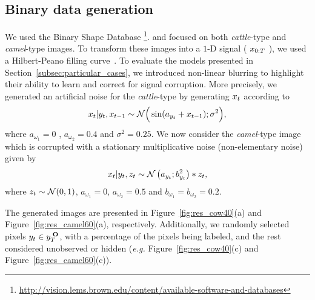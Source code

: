 \subsection{Binary data generation}
\label{subsec:data_generation}
We used the Binary Shape Database
\footnote{\url{http://vision.lems.brown.edu/content/available-software-and-databases}}.
and focused 
on both \textit{cattle}-type and \textit{camel}-type images. 
To transform these images into a $1$-D signal ( $x_{0:T}$ ), 
we used a Hilbert-Peano filling curve~\citep{sagan2012space}. 
To evaluate the models presented in Section~\ref{subsec:particular_cases},
we introduced non-linear blurring to highlight their ability to learn and
correct for signal corruption. 
More precisely, we generated an artificial noise for the \textit{cattle}-type by
generating $x_t$ according to
\begin{equation}
    \label{eq:noise_eq1}
    x_t| y_{t},x_{t-1} \sim \mathcal{N}\Big(\sin(a_{y_t}+x_{t-1});
    \sigma^2\Big),
\end{equation}
where $a_{\omega_1}=0$ , $a_{\omega_2} = 0.4$ and $\sigma^2=0.25$. 
We now consider the \textit{camel}-type image which is corrupted 
with a stationary multiplicative noise (non-elementary noise) given by
\begin{equation}
\label{eq:noise_eq2}
    x_t|y_t,z_t \sim\mathcal{N}\left(a_{y_t};b_{y_t}^2\right) * z_t,
\end{equation}
where $z_t\sim\mathcal{N}(0, 1)$, $a_{\omega_1}=0\text{, } a_{\omega_2} = 0.5$ and $b_{\omega_1}=b_{\omega_2}=0.2$. 

The generated images are presented in Figure~\ref{fig:res_cow40}(a) 
and Figure~\ref{fig:res_camel60}(a), respectively. 
Additionally, we randomly selected
pixels $y_t \in y_{T}^{\;\mathbf{O}}$, with a percentage of the pixels being labeled, and the rest considered unobserved or hidden (\textit{e.g.} Figure~\ref{fig:res_cow40}(c) 
and Figure~\ref{fig:res_camel60}(c)). %




